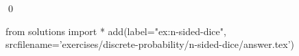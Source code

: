 
\begin{ex} 
  \label{ex:n-sided-dice}
  
  \qed
\end{ex} 
\begin{python0}
from solutions import *
add(label="ex:n-sided-dice",
    srcfilename='exercises/discrete-probability/n-sided-dice/answer.tex') 
\end{python0}
